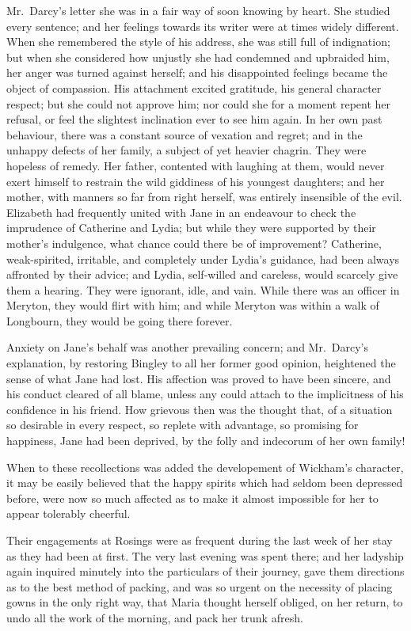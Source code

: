 \documentclass[12pt,english,oneside]{book}
\begin{document}
Mr.\ Darcy's letter she was in a fair way of soon knowing by heart.
She studied every sentence; and her feelings towards its writer were
at times widely different. When she remembered the style of his address,
she was still full of indignation; but when she considered how unjustly
she had condemned and upbraided him, her anger was turned against
herself; and his disappointed feelings became the object of compassion.
His attachment excited gratitude, his general character respect; but
she could not approve him; nor could she for a moment repent her refusal,
or feel the slightest inclination ever to see him again. In her own
past behaviour, there was a constant source of vexation and regret;
and in the unhappy defects of her family, a subject of yet heavier
chagrin. They were hopeless of remedy. Her father, contented with
laughing at them, would never exert himself to restrain the wild giddiness
of his youngest daughters; and her mother, with manners so far from
right herself, was entirely insensible of the evil. Elizabeth had
frequently united with Jane in an endeavour to check the imprudence
of Catherine and Lydia; but while they were supported by their mother's
indulgence, what chance could there be of improvement? Catherine,
weak-spirited, irritable, and completely under Lydia's guidance, had
been always affronted by their advice; and Lydia, self-willed and
careless, would scarcely give them a hearing. They were ignorant,
idle, and vain. While there was an officer in Meryton, they would
flirt with him; and while Meryton was within a walk of Longbourn,
they would be going there forever.

Anxiety on Jane's behalf was another prevailing concern; and Mr.\ Darcy's
explanation, by restoring Bingley to all her former good opinion,
heightened the sense of what Jane had lost. His affection was proved
to have been sincere, and his conduct cleared of all blame, unless
any could attach to the implicitness of his confidence in his friend.
How grievous then was the thought that, of a situation so desirable
in every respect, so replete with advantage, so promising for happiness,
Jane had been deprived, by the folly and indecorum of her own family!

When to these recollections was added the developement of Wickham's
character, it may be easily believed that the happy spirits which
had seldom been depressed before, were now so much affected as to
make it almost impossible for her to appear tolerably cheerful.

Their engagements at Rosings were as frequent during the last week
of her stay as they had been at first. The very last evening was spent
there; and her ladyship again inquired minutely into the particulars
of their journey, gave them directions as to the best method of packing,
and was so urgent on the necessity of placing gowns in the only right
way, that Maria thought herself obliged, on her return, to undo all
the work of the morning, and pack her trunk afresh.
\end{document}
